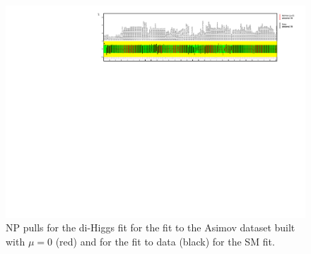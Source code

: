 \begin{figure}
\centering
\includegraphics[angle=270]{figures/results/HH/LepHad/NP_allExceptGammas_SM.pdf}
\caption{NP pulls for the di-Higgs \lephad fit for the fit to the Asimov dataset built with $\mu=0$ (red) and for the fit to data (black) for the SM fit.}
\label{fig:LepHadPostfitNPPullsSM}
\end{figure}

\clearpage

